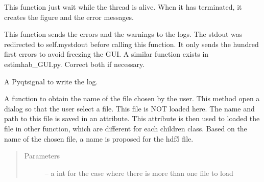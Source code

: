 \documentclass[letterpaper,10pt,english]{sphinxmanual}
\begin{document}
\begin{fulllineitems}
\begin{fulllineitems}
This function just wait while the thread is alive. When it has terminated, it creates the figure and the error
messages.

\end{fulllineitems}


\begin{fulllineitems}
\label{\detokenize{index:src_GUI.hydro_GUI_2.SubHydroW.send_err_log}}
This function sends the errors and the warnings to the logs.
The stdout was redirected to self.mystdout before calling this function. It only sends the hundred first errors
to avoid freezing the GUI. A similar function exists in estimhab\_GUI.py. Correct both if necessary.

\end{fulllineitems}


\begin{fulllineitems}
\label{\detokenize{index:src_GUI.hydro_GUI_2.SubHydroW.send_log}}
A Pyqtsignal to write the log.

\end{fulllineitems}


\begin{fulllineitems}
\label{\detokenize{index:src_GUI.hydro_GUI_2.SubHydroW.show_dialog}}
A function to obtain the name of the file chosen by the user. This method open a dialog so that the user select
a file. This file is NOT loaded here. The name and path to this file is saved in an attribute. This attribute
is then used to loaded the file in other function, which are different for each children class. Based on the
name of the chosen file, a name is proposed for the hdf5 file.
\begin{quote}\begin{description}
\item[{Parameters}] \leavevmode
{} -- a int for the case where there is more than one file to load

\end{description}\end{quote}


\end{fulllineitems}
\end{fulllineitems}
\end{document}
